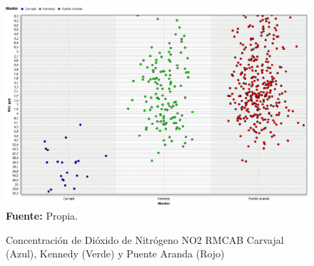 \documentclass[a4paper,openright,12pt]{book}
\theoremstyle{definition}
\theoremstyle{remark}
\begin{document}
\begin{figure}[h]
\centering
\caption{Concentración de Dióxido de Nitrógeno NO2 RMCAB Carvajal (Azul), Kennedy (Verde) y Puente Aranda (Rojo)} 
\includegraphics[scale=0.45]{RMCABanalisis/AnalisisRMCABNO2}
\label{fig:Tabla1}
\\ \textbf{Fuente: }Propia.
\end{figure}
\end{document}
